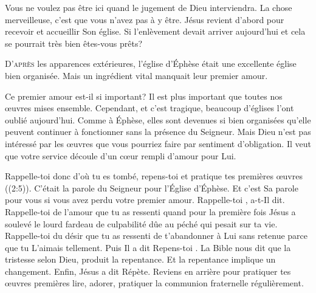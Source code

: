 Vous ne voulez pas être ici quand le jugement de Dieu interviendra.
 La chose merveilleuse, c'est que vous n'avez pas à y être.
 Jésus revient d'abord pour recevoir et accueillir Son église. 
 Si l'enlèvement devait arriver aujourd'hui
 \ocadr et cela se pourrait très bien \fcadr{} êtes-vous prêts? 

\dvrule






\lettrine{D}{'après} les apparences extérieures,
 l'église d'Éphèse était une excellente église bien organisée.
 Mais un ingrédient vital manquait \ocadr leur premier amour. 

Ce premier amour est-il si important?
 Il est plus important que toutes nos \oe{}uvres mises ensemble.
 Cependant, et c'est tragique,
 beaucoup d'églises l'ont oublié aujourd'hui.
 Comme à Éphèse, elles sont devenues si bien organisées
 qu'elle peuvent continuer à fonctionner sans la présence du Seigneur.
 Mais Dieu n'est pas intéressé par les \oe{}uvres que vous pourriez faire
 par sentiment d'obligation. Il veut que votre service découle
 d'un c\oe{}ur rempli d'amour pour Lui. 


\Og Rappelle-toi donc d'où tu es tombé, repens-toi
 et pratique tes premières \oe{}uvres \Fg{} ((2:5)).
 C'était la parole du Seigneur pour l'Église d'Éphèse.
 Et c'est Sa parole pour vous si vous avez perdu votre premier amour.
 \Og Rappelle-toi \Fg{},  a-t-Il dit.
 Rappelle-toi de l'amour que tu as ressenti quand pour la première fois
 Jésus a soulevé le lourd fardeau de culpabilité dûe au péché
 qui pesait sur ta vie. Rappelle-toi du désir que tu as ressenti
 de t'abandonner à Lui sans retenue parce que tu L'aimais tellement.
 Puis Il a dit\frcolon{}  \Og Repens-toi \Fg{}.
 La Bible nous dit que la tristesse selon Dieu, produit la repentance.
 Et la repentance implique un changement. Enfin, Jésus a dit\frcolon{} 
 \Og Répète. \Fg{} Reviens en arrière pour pratiquer tes \oe{}uvres premières
 \ocadr lire, adorer, pratiquer la communion fraternelle régulièrement. 

